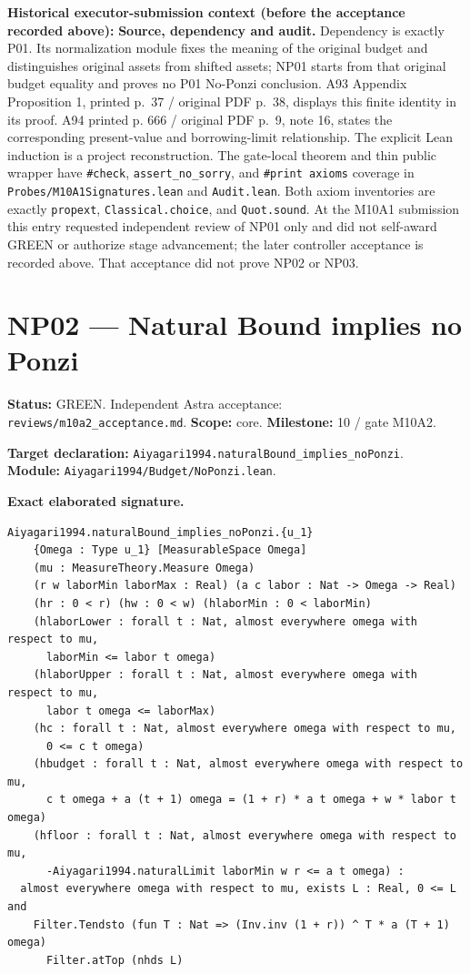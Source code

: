 \documentclass[
  11pt,
]{article}
\let\LedgerOriginalTexttt\texttt
\renewcommand{\texttt}[1]{{\small\LedgerOriginalTexttt{#1}}}
\begin{document}
\textbf{Historical executor-submission context (before the acceptance
recorded above):} \textbf{Source, dependency and audit.} Dependency is
exactly P01. Its normalization module fixes the meaning of the original
budget and distinguishes original assets from shifted assets; NP01
starts from that original budget equality and proves no P01 No-Ponzi
conclusion. A93 Appendix Proposition 1, printed p.~37 / original PDF
p.~38, displays this finite identity in its proof. A94 printed p. 666 /
original PDF p.~9, note 16, states the corresponding present-value and
borrowing-limit relationship. The explicit Lean induction is a project
reconstruction. The gate-local theorem and thin public wrapper have
\texttt{\#check}, \texttt{assert\_no\_sorry}, and
\texttt{\#print\ axioms} coverage in
\texttt{Probes/M10A1Signatures.lean} and \texttt{Audit.lean}. Both axiom
inventories are exactly \texttt{propext}, \texttt{Classical.choice}, and
\texttt{Quot.sound}. At the M10A1 submission this entry requested
independent review of NP01 only and did not self-award GREEN or
authorize stage advancement; the later controller acceptance is recorded
above. That acceptance did not prove NP02 or NP03.

\section{NP02 --- Natural Bound implies no
Ponzi}\label{np02-natural-bound-implies-no-ponzi}

\textbf{Status:} GREEN. Independent Astra acceptance:
\texttt{reviews/m10a2\_acceptance.md}. \textbf{Scope:} core.
\textbf{Milestone:} 10 / gate M10A2.

\textbf{Target declaration:}
\texttt{Aiyagari1994.naturalBound\_implies\_noPonzi}.\\
\textbf{Module:} \texttt{Aiyagari1994/Budget/NoPonzi.lean}.

\textbf{Exact elaborated signature.}

\begin{verbatim}
Aiyagari1994.naturalBound_implies_noPonzi.{u_1}
    {Omega : Type u_1} [MeasurableSpace Omega]
    (mu : MeasureTheory.Measure Omega)
    (r w laborMin laborMax : Real) (a c labor : Nat -> Omega -> Real)
    (hr : 0 < r) (hw : 0 < w) (hlaborMin : 0 < laborMin)
    (hlaborLower : forall t : Nat, almost everywhere omega with respect to mu,
      laborMin <= labor t omega)
    (hlaborUpper : forall t : Nat, almost everywhere omega with respect to mu,
      labor t omega <= laborMax)
    (hc : forall t : Nat, almost everywhere omega with respect to mu,
      0 <= c t omega)
    (hbudget : forall t : Nat, almost everywhere omega with respect to mu,
      c t omega + a (t + 1) omega = (1 + r) * a t omega + w * labor t omega)
    (hfloor : forall t : Nat, almost everywhere omega with respect to mu,
      -Aiyagari1994.naturalLimit laborMin w r <= a t omega) :
  almost everywhere omega with respect to mu, exists L : Real, 0 <= L and
    Filter.Tendsto (fun T : Nat => (Inv.inv (1 + r)) ^ T * a (T + 1) omega)
      Filter.atTop (nhds L)
\end{verbatim}
\end{document}
